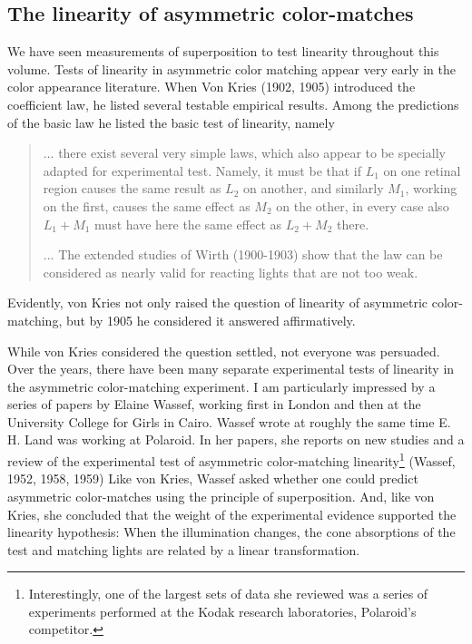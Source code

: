\subsection*{The linearity of asymmetric color-matches}
We have seen measurements of superposition to test linearity
throughout this volume.  Tests of linearity in asymmetric color
matching appear very early in the color appearance literature.  When
Von Kries (1902, 1905) introduced the coefficient law, he listed several
testable empirical results.  Among the predictions of the basic law
he listed the basic test of linearity, namely
\begin{quote}
 ... there exist several very simple laws, which also appear to be
specially adapted for experimental test.  Namely, it must be that if
$L_1$ on one retinal region causes the same result as $L_2$ on
another, and similarly $M_1$, working on the first, causes the same
effect as $M_2$ on the other, in every case also $L_1 + M_1$ must have
here the same effect as $L_2 + M_2$ there.

 ...  The extended studies of Wirth (1900-1903) show that the law can
be considered as nearly valid for reacting lights that are not too
weak.
\end{quote}
Evidently, von Kries not only raised the question of linearity of
asymmetric color-matching, but by 1905 he considered it answered
affirmatively.

While von Kries considered the question settled, not everyone was
persuaded.  Over the years, there have been many separate experimental
tests of linearity in the asymmetric color-matching experiment.  I am
particularly impressed by a series of papers by Elaine Wassef, working
first in London and then at the University College for Girls in Cairo.
Wassef wrote at roughly the same time E. H. Land was working at
Polaroid.  In her papers, she reports on new studies and a review of
the experimental test of asymmetric color-matching linearity\footnote{
Interestingly, one of the largest sets of data she reviewed was a
series of experiments performed at the Kodak research laboratories,
Polaroid's competitor.  }  (Wassef, 1952, 1958, 1959) Like von Kries,
Wassef asked whether one could predict asymmetric color-matches using
the principle of superposition.  And, like von Kries, she concluded
that the weight of the experimental evidence supported the linearity
hypothesis: When the illumination changes, the cone absorptions of the
test and matching lights are related by a linear transformation.


